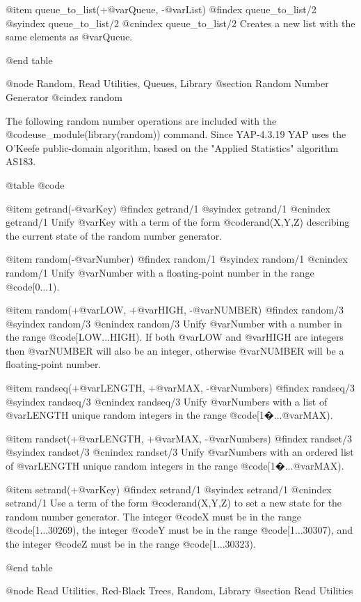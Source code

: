 {{{{{{{{{@item queue_to_list(+@var{Queue}, -@var{List})
@findex queue_to_list/2
@syindex queue_to_list/2
@cnindex queue_to_list/2
Creates a new list with the same elements as @var{Queue}.

@end table


@node Random, Read Utilities, Queues, Library
@section Random Number Generator
@cindex random

The following random number operations are included with the
@code{use_module(library(random))} command. Since YAP-4.3.19 YAP uses
the O'Keefe public-domain algorithm, based on the "Applied Statistics"
algorithm AS183.

@table @code

@item getrand(-@var{Key})
@findex getrand/1
@syindex getrand/1
@cnindex getrand/1
Unify @var{Key} with a term of the form @code{rand(X,Y,Z)} describing the
current state of the random number generator.

@item random(-@var{Number})
@findex random/1
@syindex random/1
@cnindex random/1
Unify @var{Number} with a floating-point number in the range @code{[0...1)}.

@item random(+@var{LOW}, +@var{HIGH}, -@var{NUMBER})
@findex random/3
@syindex random/3
@cnindex random/3
Unify @var{Number} with a number in the range
@code{[LOW...HIGH)}. If both @var{LOW} and @var{HIGH} are
integers then @var{NUMBER} will also be an integer, otherwise
@var{NUMBER} will be a floating-point number.

@item randseq(+@var{LENGTH}, +@var{MAX}, -@var{Numbers})
@findex randseq/3
@syindex randseq/3
@cnindex randseq/3
Unify @var{Numbers} with a list of @var{LENGTH} unique random integers
in the range @code{[1�...@var{MAX})}.

@item randset(+@var{LENGTH}, +@var{MAX}, -@var{Numbers})
@findex randset/3
@syindex randset/3
@cnindex randset/3
Unify @var{Numbers} with an ordered list of @var{LENGTH} unique random
integers in the range @code{[1�...@var{MAX})}.

@item setrand(+@var{Key})
@findex setrand/1
@syindex setrand/1
@cnindex setrand/1
Use a term of the form @code{rand(X,Y,Z)} to set a new state for the
random number generator. The integer @code{X} must be in the range
@code{[1...30269)}, the integer @code{Y} must be in the range
@code{[1...30307)}, and the integer @code{Z} must be in the range
@code{[1...30323)}.

@end table

@node Read Utilities, Red-Black Trees, Random, Library
@section Read Utilities

}}}}}}}}}
